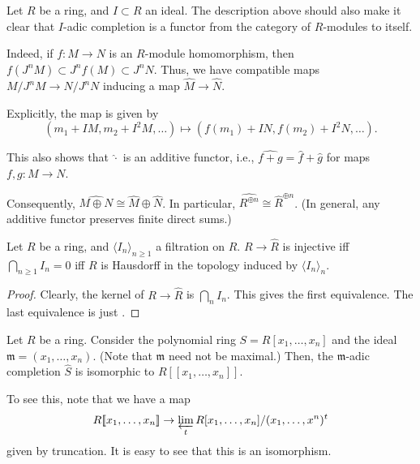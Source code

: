 \documentclass[12pt]{article}
\begin{document}
\begin{obs} \label{obs:completion-additive-functor}
	Let $R$ be a ring, and $I \subset R$ an ideal. The description above should also make it clear that $I$-adic completion is a functor from the category of $R$-modules to itself.

	Indeed, if $f : M \to N$ is an $R$-module homomorphism, then $f(J^{n} M) \subset J^{n} f(M) \subset J^{n} N$. \newline
	Thus, we have compatible maps $M/J^{n} M \to N/J^{n} N$ inducing a map $\widehat{M} \to \widehat{N}$.

	Explicitly, the map is given by
	\begin{equation*} 
		(m_{1} + I M, m_{2} + I^{2} M, \ldots) \mapsto (f(m_{1}) + I N, f(m_{2}) + I^{2} N, \ldots).
	\end{equation*}

	This also shows that $\widehat{\cdot}$ is an additive functor, i.e., $\widehat{f + g} = \widehat{f} + \widehat{g}$ for maps $f, g : M \to N$.

	Consequently, $\widehat{M \oplus N} \cong \widehat{M} \oplus \widehat{N}$. In particular, $\widehat{R^{\oplus n}} \cong \widehat{R}^{\oplus n}$. (In general, any additive functor preserves finite direct sums.)
\end{obs}

\begin{prop} \label{prop:R-to-completion-injective-hausdorff}
	Let $R$ be a ring, and $\langle I_{n} \rangle_{n \ge 1}$ a filtration on $R$. \newline
	$R \to \widehat{R}$ is injective iff $\bigcap_{n \ge 1} I_{n} = 0$ iff $R$ is Hausdorff in the topology induced by $\langle I_{n} \rangle_{n}$.
\end{prop}
\begin{proof} 
	Clearly, the kernel of $R \to \widehat{R}$ is $\bigcap_{n} I_{n}$. This gives the first equivalence. The last equivalence is just .
\end{proof}

\begin{ex}
	Let $R$ be a ring. Consider the polynomial ring $S = R[x_{1}, \ldots, x_{n}]$ and the ideal $\mathfrak{m} = (x_{1}, \ldots, x_{n})$. (Note that $\mathfrak{m}$ need not be maximal.) \newline
	Then, the $\mathfrak{m}$-adic completion $\widehat{S}$ is isomorphic to $R[\![x_{1}, \ldots, x_{n}]\!]$.

	To see this, note that we have a map
	\begin{equation*} 
		R[\![x_{1}, \ldots, x_{n}]\!] \to \varprojlim_{t} R[x_{1}, \ldots, x_{n}]/(x_{1}, \ldots, x^{n})^{t}
	\end{equation*}
	given by truncation. It is easy to see that this is an isomorphism.
\end{ex}
\end{document}
